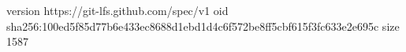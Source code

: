 version https://git-lfs.github.com/spec/v1
oid sha256:100ed5f85d77b6e433ec8688d1ebd1d4c6f572be8ff5cbf615f3fc633e2e695c
size 1587
